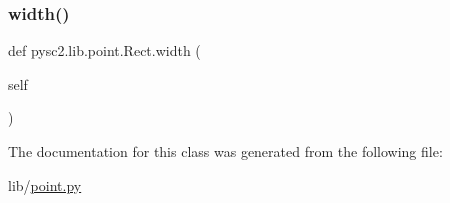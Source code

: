 \subsubsection{\texorpdfstring{width()}{width()}}
{\footnotesize\ttfamily def pysc2.\+lib.\+point.\+Rect.\+width (\begin{DoxyParamCaption}\item[{}]{self }\end{DoxyParamCaption})}



The documentation for this class was generated from the following file\+:\begin{DoxyCompactItemize}
\item 
lib/\mbox{\hyperlink{point_8py}{point.\+py}}\end{DoxyCompactItemize}
